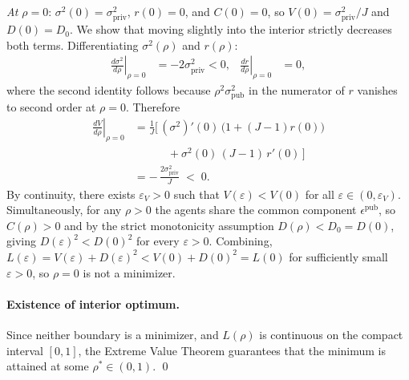 \documentclass[11pt]{article}
\theoremstyle{plain}
\theoremstyle{definition}
\begin{document}
  \textit{At $\rho = 0$}: $\sigma^2(0) = \sigma_{\mathrm{priv}}^2$, $r(0) = 0$, and $C(0) = 0$, so $V(0) = \sigma_{\mathrm{priv}}^2 / J$ and $D(0) = D_0$. We show that moving slightly into the interior strictly decreases both terms. Differentiating $\sigma^2(\rho)$ and $r(\rho)$:
\begin{align}
\left.\frac{d\sigma^2}{d\rho}\right|_{\rho=0} &= -2\sigma_{\mathrm{priv}}^2 < 0, &
\left.\frac{dr}{d\rho}\right|_{\rho=0} &= 0,
\end{align}
  where the second identity follows because $\rho^2\sigma_{\mathrm{pub}}^2$ in the numerator of $r$ vanishes to second order at $\rho = 0$. Therefore
\begin{equation}
  \begin{aligned}
  \left.\frac{dV}{d\rho}\right|_{\rho=0}
   &= \frac{1}{J}\Big[\,(\sigma^2)'(0)\,\big(1+(J{-}1)r(0)\big) \\
   &\qquad\quad + \sigma^2(0)\,(J{-}1)\,r'(0)\,\Big] \\
   &= -\,\frac{2\sigma_{\mathrm{priv}}^2}{J} \;<\; 0.
  \end{aligned}
  \end{equation}
  By continuity, there exists $\varepsilon_V > 0$ such that $V(\varepsilon) < V(0)$ for all $\varepsilon \in (0, \varepsilon_V)$. Simultaneously, for any $\rho > 0$ the agents share the common component $\epsilon^{\mathrm{pub}}$, so $C(\rho) > 0$ and by the strict monotonicity assumption $D(\rho) < D_0 = D(0)$, giving $D(\varepsilon)^2 < D(0)^2$ for every $\varepsilon > 0$.
  Combining, $L(\varepsilon) = V(\varepsilon) + D(\varepsilon)^2 < V(0) + D(0)^2 = L(0)$ for sufficiently small $\varepsilon > 0$, so $\rho = 0$ is not a minimizer.

  \paragraph{Existence of interior optimum.}
  Since neither boundary is a minimizer, and $L(\rho)$ is continuous on the
  compact interval $[0,1]$, the Extreme Value Theorem guarantees that the minimum
  is attained at some $\rho^* \in (0,1)$. \qed
\end{document}
